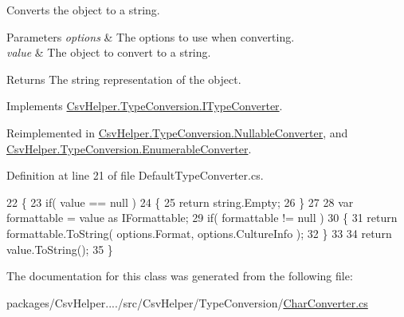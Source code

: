Converts the object to a string. 


\begin{DoxyParams}{Parameters}
{\em options} & The options to use when converting.\\
\hline
{\em value} & The object to convert to a string.\\
\hline
\end{DoxyParams}
\begin{DoxyReturn}{Returns}
The string representation of the object.
\end{DoxyReturn}


Implements \hyperlink{a00125_a90c465c63dbcf913f38aa878f35e77c7}{Csv\-Helper.\-Type\-Conversion.\-I\-Type\-Converter}.



Reimplemented in \hyperlink{a00144_a7205cdb61d2d119582958232b3e63109}{Csv\-Helper.\-Type\-Conversion.\-Nullable\-Converter}, and \hyperlink{a00101_a7e07e9532857d748654d37db590a0e11}{Csv\-Helper.\-Type\-Conversion.\-Enumerable\-Converter}.



Definition at line 21 of file Default\-Type\-Converter.\-cs.


\begin{DoxyCode}
22         \{
23             \textcolor{keywordflow}{if}( value == null )
24             \{
25                 \textcolor{keywordflow}{return} string.Empty;
26             \}
27 
28             var formattable = value as IFormattable;
29             \textcolor{keywordflow}{if}( formattable != null )
30             \{
31                 \textcolor{keywordflow}{return} formattable.ToString( options.Format, options.CultureInfo );
32             \}
33 
34             \textcolor{keywordflow}{return} value.ToString();
35         \}
\end{DoxyCode}


The documentation for this class was generated from the following file\-:\begin{DoxyCompactItemize}
\item 
packages/\-Csv\-Helper..../src/\-Csv\-Helper/\-Type\-Conversion/\hyperlink{a00265}{Char\-Converter.\-cs}\end{DoxyCompactItemize}
